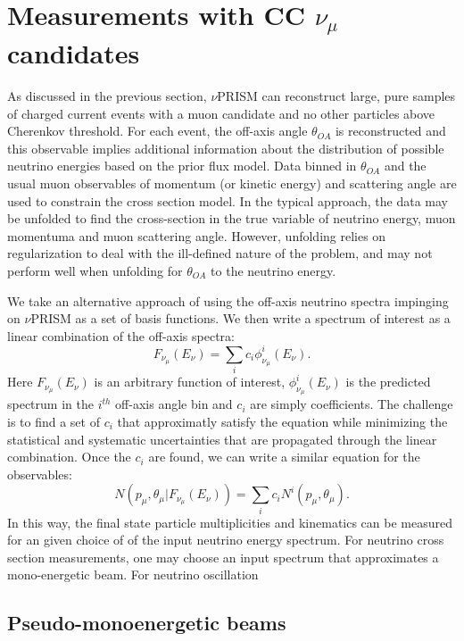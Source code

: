 \section{Measurements with CC $\nu_{\mu}$ candidates \label{sec:nuprism_numu}}

As discussed in the previous section, $\nu$PRISM can reconstruct large, pure samples of charged current
events with a muon candidate and no other particles above Cherenkov threshold.  For each event, the
off-axis angle $\theta_{OA}$ is reconstructed and this observable implies additional information about the
distribution of possible neutrino energies based on the prior flux model.  Data binned in $\theta_{OA}$ and the
usual muon observables of momentum (or kinetic energy) and scattering angle are used to constrain the
cross section model.  In the typical approach, the data may be unfolded to find the cross-section in the
true variable of neutrino energy, muon momentuma and muon scattering angle.  However, unfolding relies 
on regularization to deal with the ill-defined nature of the problem, and may not perform well when 
unfolding for $\theta_{OA}$ to the neutrino energy.

We take an alternative approach of using the off-axis neutrino spectra impinging on $\nu$PRISM as a set of basis
functions.  We then write a spectrum of interest as a linear combination of the off-axis spectra:
\begin{equation}
F_{\nu_{\mu}}(E_{\nu}) = \sum_{i} c_{i}\phi^{i}_{\nu_{\mu}}(E_{\nu}).
\end{equation}
Here $F_{\nu_{\mu}}(E_{\nu})$ is an arbitrary function of interest, $\phi^{i}_{\nu_{\mu}}(E_{\nu})$ is the predicted spectrum
in the $i^{th}$ off-axis angle bin and $c_{i}$ are simply coefficients.  The challenge is to find a set of $c_{i}$
that approximatly satisfy the equation while minimizing the statistical and systematic uncertainties that are propagated through the
linear combination.  Once the $c_{i}$ are found, we can write a similar equation for the observables:
\begin{equation}
N(p_{\mu},\theta_{\mu}|F_{\nu_{\mu}}(E_{\nu})) = \sum_{i} c_{i}N^{i}(p_{\mu},\theta_{\mu}).
\end{equation}
In this way, the final state particle multiplicities and kinematics can be measured for an given choice of 
of the input neutrino energy spectrum.  For neutrino cross section measurements, one may choose an input spectrum that
approximates a mono-energetic beam.  For neutrino oscillation 

\subsection{Pseudo-monoenergetic beams}

